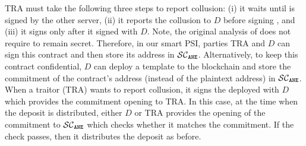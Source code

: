 TRA must take the following three steps to report collusion: (i) it waits until \SCcc is signed by the other server, (ii) it reports the collusion to $ { D}$ before signing \SCcc, and (iii) it signs \SCcc only after it signed \SCtc with $ { D}$. Note, the original analysis of \SCtc does not require \SCtc to remain secret. Therefore, in our smart PSI, parties TRA and $ { D}$ can sign this contract and   then store its address in $\mathcal{SC}_{\mathtt{ANE}}$. Alternatively, to keep this contract confidential, $ { D}$ can deploy a template \SCtc to the blockchain and store the commitment of the contract's address (instead of the plaintext address) in $\mathcal{SC}_{\mathtt{ANE}}$. When a traitor (TRA) wants to report collusion, it signs the deployed \SCtc with  $ { D}$ which provides the commitment opening to TRA. In this case, at the time when the deposit is distributed,   either $ { D}$ or TRA   provides the opening of the commitment to  $\mathcal{SC}_{\mathtt{ANE}}$ which checks whether it matches the commitment. If the check passes, then it distributes the deposit as before. 

































